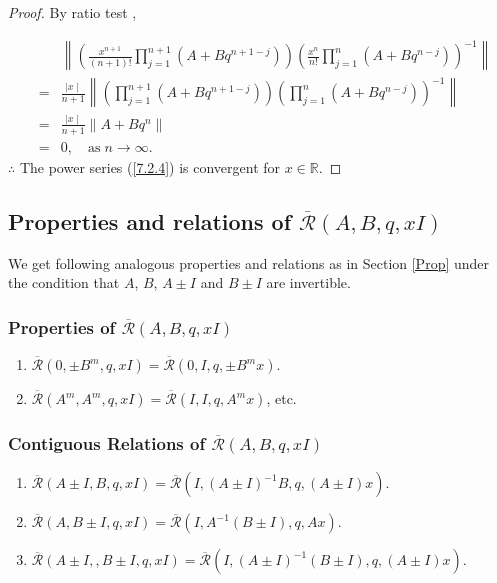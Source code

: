 \documentclass[12pt]{article}
\numberwithin{equation}{section}
\begin{document}
\begin{proof} By ratio test \cite{Lucas},
 
\begin{eqnarray*}
&&\left\|\left(\frac{x^{n+1}}{(n+1)!}\prod_{j=1}^{n+1}\left(A+Bq^{n+1-j}\right)\right)\left(\frac{x^n}{n!}\prod_{j=1}^{n}\left(A+Bq^{n-j}\right)\right)^{-1}\right\|\\
&=&\frac{\mid x \mid}{n+1} \left\|\left(\prod_{j=1}^{n+1}\left(A+Bq^{n+1-j}\right)\right)\left(\prod_{j=1}^{n}\left(A+Bq^{n-j}\right)\right)^{-1}\right\| \\
&=&\frac{\mid x \mid}{n+1} \left\| A + Bq^n\right\|\\
&=& 0,\quad \textrm{as}\;n \longrightarrow \infty.
\end{eqnarray*}
$\therefore$ The power series  (\ref{7.2.4}) is convergent for $x\in\mathbb{R}$.
\end{proof}
\subsection{Properties and relations of $\overline{\mathcal{R}}(A,B,q,xI)$}
\par We get following analogous properties and relations as in Section \ref{Prop}  under the condition  that $A$, $B$, $A\pm I$ and $B\pm I$ are invertible.
\subsubsection{Properties of $\overline{\mathcal{R}}(A,B,q,xI)$}
\begin{enumerate}
\item $\overline{\mathcal{R}}\left(0,\pm B^m,q,xI\right) =  \overline{\mathcal{R}}\left(0,I,q,\pm B^mx\right)$.
\item $\overline{\mathcal{R}}\left(A^m, A^m,q,xI\right) =  \overline{\mathcal{R}}\left(I,I,q,A^mx\right)$, etc.
\end{enumerate}

\subsubsection{Contiguous Relations of $\overline{\mathcal{R}}(A,B,q,xI)$}
\begin{enumerate}
\item$\overline{\mathcal{R}}\left(A\pm I, B, q, xI\right) = \overline{\mathcal{R}}\left(I, (A \pm I)^{-1} B, q, (A \pm I)x\right)$.
\item$\overline{\mathcal{R}}\left(A, B\pm I, q, xI\right) = \overline{\mathcal{R}}\left(I, A^{-1}(B \pm I), q, Ax\right)$.
\item$\overline{\mathcal{R}}\left(A\pm I,, B\pm I, q, xI \right) = \overline{\mathcal{R}} \left(I, (A \pm I)^{-1}(B \pm I), q,  (A \pm I)x\right)$.
\end{enumerate}
\end{document}
